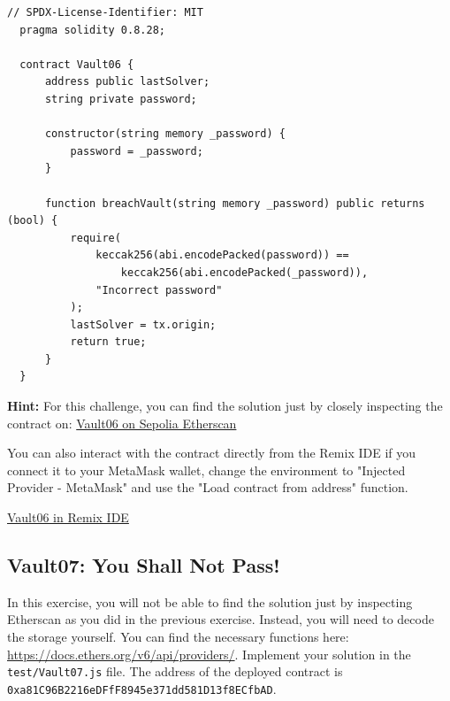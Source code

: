 \documentclass[12pt]{article}
\begin{document}
\noindent
\begin{minipage}{\textwidth}
    \begin{lstlisting}[language=Solidity]
  // SPDX-License-Identifier: MIT
  pragma solidity 0.8.28;
  
  contract Vault06 {
      address public lastSolver;
      string private password;
  
      constructor(string memory _password) {
          password = _password;
      }
  
      function breachVault(string memory _password) public returns (bool) {
          require(
              keccak256(abi.encodePacked(password)) ==
                  keccak256(abi.encodePacked(_password)),
              "Incorrect password"
          );
          lastSolver = tx.origin;
          return true;
      }
  }
\end{lstlisting}
\end{minipage}

\medskip
\noindent
\textbf{Hint:} For this challenge, you can find the solution just by closely inspecting the contract on: \href{https://sepolia.etherscan.io/address/0xA3a763bF62550511A0E485d6EB16c98937609A32}{Vault06 on Sepolia Etherscan}

\medskip
\noindent
You can also interact with the contract directly from the Remix IDE if you connect it to your MetaMask wallet, change the environment to "Injected Provider - MetaMask" and use the "Load contract from address" function.

\medskip
\noindent
\href{https://remix.ethereum.org/?#activate=solidity&url=https://github.com/radovluk/unbreakable-vault/contracts/Vault06.sol&lang=en&optimize=false&runs=200&evmVersion=null&version=soljson-v0.8.28+commit.7893614a.js}{Vault06 in Remix IDE}

\subsection*{Vault07: You Shall Not Pass!}

\noindent
In this exercise, you will not be able to find the solution just by inspecting Etherscan as you did in the previous exercise. Instead, you will need to decode the storage yourself. You can find the necessary functions here: \href{https://docs.ethers.org/v6/api/providers/}{https://docs.ethers.org/v6/api/providers/}. Implement your solution in the \texttt{test/Vault07.js} file. The address of the deployed contract is \texttt{0xa81C96B2216eDFfF8945e371dd581D13f8ECfbAD}.
\end{document}
